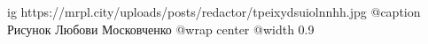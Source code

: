  
 
 
 
 

\ifcmt
  ig https://mrpl.city/uploads/posts/redactor/tpeixydsuiolnnhh.jpg
	@caption Рисунок Любови Московченко
  @wrap center
  @width 0.9
\fi
